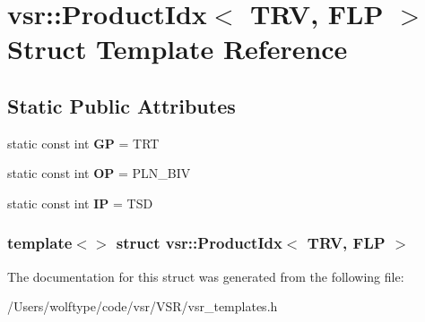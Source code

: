 \hypertarget{structvsr_1_1_product_idx_3_01_t_r_v_00_01_f_l_p_01_4}{\section{vsr\-:\-:Product\-Idx$<$ T\-R\-V, F\-L\-P $>$ Struct Template Reference}
\label{structvsr_1_1_product_idx_3_01_t_r_v_00_01_f_l_p_01_4}
}
\subsection*{Static Public Attributes}
\begin{DoxyCompactItemize}
\item 
\hypertarget{structvsr_1_1_product_idx_3_01_t_r_v_00_01_f_l_p_01_4_a453c1ab532cae729a637c37ba059f13b}{static const int {\bfseries G\-P} = T\-R\-T}\label{structvsr_1_1_product_idx_3_01_t_r_v_00_01_f_l_p_01_4_a453c1ab532cae729a637c37ba059f13b}

\item 
\hypertarget{structvsr_1_1_product_idx_3_01_t_r_v_00_01_f_l_p_01_4_af717fb4a7f1ced92bfc1ee95a91e1bab}{static const int {\bfseries O\-P} = P\-L\-N\-\_\-\-B\-I\-V}\label{structvsr_1_1_product_idx_3_01_t_r_v_00_01_f_l_p_01_4_af717fb4a7f1ced92bfc1ee95a91e1bab}

\item 
\hypertarget{structvsr_1_1_product_idx_3_01_t_r_v_00_01_f_l_p_01_4_a9ff83bb0348d4778c9816c82a0272248}{static const int {\bfseries I\-P} = T\-S\-D}\label{structvsr_1_1_product_idx_3_01_t_r_v_00_01_f_l_p_01_4_a9ff83bb0348d4778c9816c82a0272248}

\end{DoxyCompactItemize}
\subsubsection*{template$<$$>$ struct vsr\-::\-Product\-Idx$<$ T\-R\-V, F\-L\-P $>$}



The documentation for this struct was generated from the following file\-:\begin{DoxyCompactItemize}
\item 
/\-Users/wolftype/code/vsr/\-V\-S\-R/vsr\-\_\-templates.\-h\end{DoxyCompactItemize}
